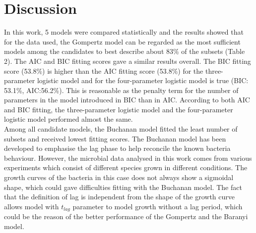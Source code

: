 \documentclass[a4paper,11pt]{article}
\theoremstyle{definition}
\begin{document}
\section{Discussion}
In this work, 5 models were compared statistically and the results showed that for the data used, the Gompertz model can be regarded as the most sufficient models among the candidates to best describe about 83\% of the subsets (Table 2). The AIC and BIC fitting scores gave a similar results overall. The BIC fitting score (53.8\%) is higher than the AIC fitting score (53.8\%) for the three-parameter logistic model and for the four-parameter logistic model is true (BIC: 53.1\%, AIC:56.2\%). This is reasonable as the penalty term for the number of parameters in the model introduced in BIC than in AIC. According to both AIC and BIC fitting, the three-parameter logistic model and the four-parameter logistic model performed almost the same.\\
Among all candidate models, the Buchanan model fitted the least number of subsets and received lowest fitting scores. The Buchanan model has been developed to emphasise the lag phase to help reconcile the known bacteria behaviour. However, the microbial data analysed in this work comes from various experiments which consist of different species grown in different conditions. The growth curves of the bacteria in this case does not always show a sigmoidal shape, which could gave difficulties fitting with the Buchanan model. The fact that the definition of lag is independent from the shape of the growth curve allows model with $t_{lag}$ parameter to model growth without a lag period, which could be the reason of the better performance of the Gompertz and the Baranyi model. 






  
\end{document}
